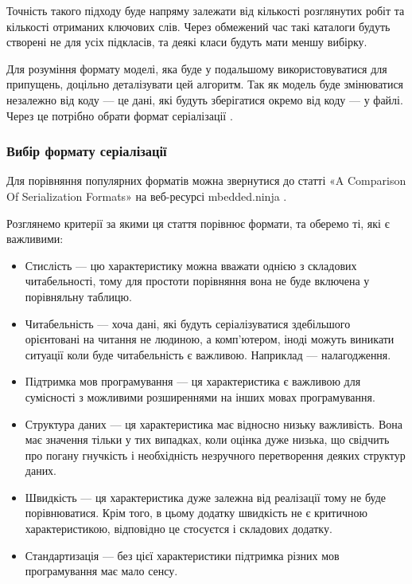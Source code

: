 \documentclass[14pt]{extarticle}
\begin{document}
  Точність такого підходу буде напряму залежати від кількості розглянутих робіт
  та кількості отриманих ключових слів.
  Через обмежений час такі каталоги будуть створені не для усіх підкласів,
  та деякі класи будуть мати меншу вибірку.

  Для розуміння формату моделі,
  яка буде у подальшому використовуватися для припущень,
  доцільно деталізувати цей алгоритм.
  Так як модель буде змінюватися незалежно від коду --- це дані,
  які будуть зберігатися окремо від коду --- у файлі.
  Через це потрібно обрати формат серіалізації
  \cite{wiki_serialization,wiki_serialization_comparison}.

  \subsubsection{Вибір формату серіалізації}

  Для порівняння популярних форматів можна звернутися до статті
  «A Comparison Of Serialization Formats»
  \cite{mbedded_ninja_serialization_comparison} на веб-ресурсі mbedded.ninja
  \cite{mbedded_ninja}.

  Розглянемо критерії за якими ця стаття порівнює формати, та оберемо ті,
  які є важливими:

  \begin{itemize}[labelindent=\dimexpr{}\relax, leftmargin=*]
    \item Стислість --- цю характеристику можна вважати однією з складових
      читабельності,
      тому для простоти порівняння вона не буде включена у порівняльну таблицю.
    \item Читабельність --- хоча дані,
      які будуть серіалізуватися здебільшого орієнтовані на читання не людиною,
      а комп'ютером,
      іноді можуть виникати ситуації коли буде читабельність є важливою.
      Наприклад --- налагодження.
    \item Підтримка мов програмування --- ця характеристика є важливою
      для сумісності \cite{wiki_interop}
      з можливими розширеннями на інших мовах програмування.
    \item Структура даних --- ця характеристика має відносно низьку важливість.
      Вона має значення тільки у тих випадках, коли оцінка дуже низька,
      що свідчить про погану гнучкість
      і необхідність незручного перетворення деяких структур даних.
    \item Швидкість --- ця характеристика дуже залежна від реалізації
      тому не буде порівнюватися.
      Крім того, в цьому додатку швидкість не є критичною характеристикою,
      відповідно це стосуєтся і складових додатку.
    \item Стандартизація --- без цієї характеристики
      підтримка різних мов програмування має мало сенсу.
  \end{itemize}
\end{document}
